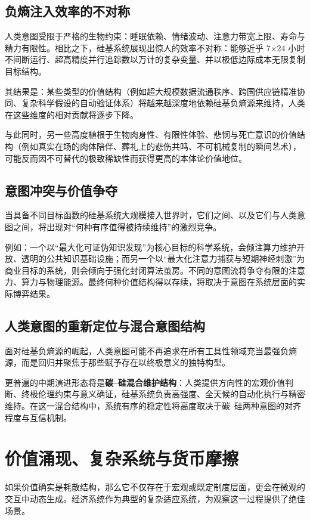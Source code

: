 \documentclass[11pt,a4paper]{ctexart}
\begin{document}
\subsection{负熵注入效率的不对称}
人类意图受限于严格的生物约束：睡眠依赖、情绪波动、注意力带宽上限、寿命与精力有限性。相比之下，硅基系统展现出惊人的效率不对称：能够近乎 7×24 小时不间断运行、超高精度并行追踪数以万计的复杂变量、并以极低边际成本无限复制目标结构。

其结果是：某些类型的价值结构（例如超大规模数据流通秩序、跨国供应链精准协同、复杂科学假设的自动验证体系）将越来越深度地依赖硅基负熵源来维持，人类在这些维度的相对贡献将逐步下降。

与此同时，另一些高度植根于生物肉身性、有限性体验、悲悯与死亡意识的价值结构（例如真实在场的肉体陪伴、葬礼上的悲伤共鸣、不可机械复制的瞬间艺术），可能反而因不可替代的极致稀缺性而获得更高的本体论价值地位。

\subsection{意图冲突与价值争夺}
当具备不同目标函数的硅基系统大规模接入世界时，它们之间、以及它们与人类意图之间，将出现对“何种有序值得被持续维持”的激烈竞争。

例如：一个以“最大化可证伪知识发现”为核心目标的科学系统，会倾注算力维护开放、透明的公共知识基础设施；而另一个以“最大化注意力捕获与短期神经刺激”为商业目标的系统，则会倾向于强化封闭算法茧房。不同的意图流将争夺有限的注意力、算力与物理能源。最终何种价值结构得以存续，将取决于意图在系统层面的实际博弈结果。

\subsection{人类意图的重新定位与混合意图结构}
面对硅基负熵源的崛起，人类意图可能不再追求在所有工具性领域充当最强负熵源，而是回归并聚焦于那些赋予存在以终极意义的独特构型。

更普遍的中期演进形态将是\textbf{碳--硅混合维护结构}：人类提供方向性的宏观价值判断、终极伦理约束与意义确证，硅基系统负责高强度、全天候的自动化执行与精密维持。在这一混合结构中，系统有序的稳定性将高度取决于碳--硅两种意图的对齐程度与互信机制。

\section{价值涌现、复杂系统与货币摩擦}

如果价值确实是耗散结构，那么它不仅存在于宏观或既定制度层面，更会在微观的交互中动态生成。经济系统作为典型的复杂适应系统，为观察这一过程提供了绝佳场景。
\end{document}
